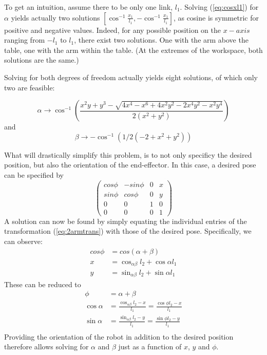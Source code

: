 To get an intuition, assume there to be only one link, $l_1$.  Solving (\ref{eq:cosxl1}) for $\alpha$ yields actually two solutions $\left[\cos^{-1}\frac{x_1}{l_1},-\cos^{-1}\frac{x_1}{l_1}\right]$, as cosine is symmetric for positive and negative values. Indeed, for any possible position on the $x-axis$ ranging from $-l_1$ to $l_1$, there exist two solutions. One with the arm above the table, one with the arm within the table. (At the extremes of the workspace, both solutions are the same.)


Solving for both degrees of freedom actually yields eight solutions, of which only two are feasible:

\begin{equation}
\alpha \rightarrow \cos^{-1}\left(\frac{x^2 y + y^3 - \sqrt{4 x^4 - x^6 + 4 x^2 y^2 - 2 x^4 y^2 - x^2 y^4}}{2 (x^2 + y^2)}\right)
\end{equation}
and
\begin{equation}
\beta \rightarrow -\cos^{-1}\left(1/2(-2+x^2+y^2)\right)
\end{equation}

What will drastically simplify this problem, is to not only specificy the desired position, but also the orientation of the end-effector. In this case, a desired pose can be specified by
\begin{equation}
\left(
\begin{array}{cccc}
cos\phi & -sin\phi & 0 & x\\
sin\phi & cos\phi & 0 & y\\
0 & 0 & 1 & 0\\
0 & 0 & 0 & 1
\end{array}
\right)
\end{equation}
A solution can now be found by simply equating the individual entries of the transformation (\ref{eq:2armtrans}) with those of the desired pose. Specifically, we can observe:
\begin{eqnarray}
cos\phi &= cos(\alpha+\beta)\\
\nonumber
x &= \cos_{\alpha\beta}l_2+\cos\alpha l_1\\
\nonumber
y &= \sin_{\alpha\beta}l_2+\sin\alpha l_1
\end{eqnarray}
These can be reduced to
\begin{eqnarray}
\phi &= \alpha + \beta\\
\nonumber
\cos\alpha &= \frac{\cos_{\alpha\beta}l_2-x}{l_1}=\frac{\cos\phi l_2-x}{l_1}\\
\nonumber
\sin\alpha &= \frac{\sin_{\alpha\beta}l_2-y}{l_1}=\frac{\sin\phi l_2-y}{l_1}\\
\end{eqnarray}
Providing the orientation of the robot in addition to the desired position therefore allows solving for $\alpha$ and $\beta$ just as a function of $x$, $y$ and $\phi$.  

